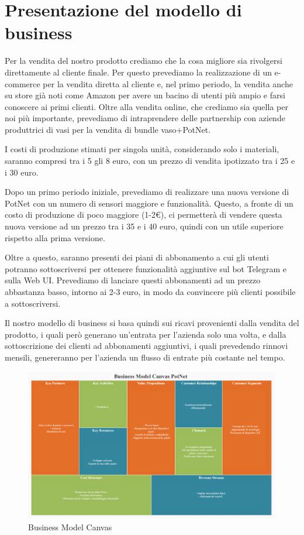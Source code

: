 \section{Presentazione del modello di business}

Per la vendita del nostro prodotto crediamo che la cosa migliore sia rivolgersi direttamente al cliente finale. Per questo prevediamo la realizzazione di un e-commerce per la vendita diretta al cliente e, nel primo periodo, la vendita anche su store già noti come Amazon per avere un bacino di utenti più ampio e farsi conoscere ai primi clienti. Oltre alla vendita online, che crediamo sia quella per noi più importante, prevediamo di intraprendere delle partnership con aziende produttrici di vasi per la vendita di bundle vaso+PotNet.

I costi di produzione stimati per singola unità, considerando solo i materiali, saranno compresi tra i 5 gli 8 euro, con un prezzo di vendita ipotizzato tra i 25 e i 30 euro.

Dopo un primo periodo iniziale, prevediamo di realizzare una nuova versione di PotNet con un numero di sensori maggiore e funzionalità. Questo, a fronte di un costo di produzione di poco maggiore (1-2€), ci permetterà di vendere questa nuova versione ad un prezzo tra i 35 e i 40 euro, quindi con un utile superiore rispetto alla prima versione.

Oltre a questo, saranno presenti dei piani di abbonamento a cui gli utenti potranno sottoscriversi per ottenere funzionalità aggiuntive sul bot Telegram e sulla Web UI. Prevediamo di lanciare questi abbonamenti ad un prezzo abbastanza basso, intorno ai 2-3 euro, in modo da convincere più clienti possibile a sottoscriversi.

Il nostro modello di business si basa quindi sui ricavi provenienti dalla vendita del prodotto, i quali però generano un'entrata per l'azienda solo una volta, e dalla sottoscrizione dei clienti ad abbonamenti aggiuntivi, i quali prevedendo rinnovi mensili, genereranno per l'azienda un flusso di entrate più costante nel tempo.

\begin{figure}[ht!]
	\centering
	\includegraphics[width=\textwidth]{./images/Business-Model-Canvas.PNG} 
	\caption{Business Model Canvas \label{overflow}}
\end{figure}